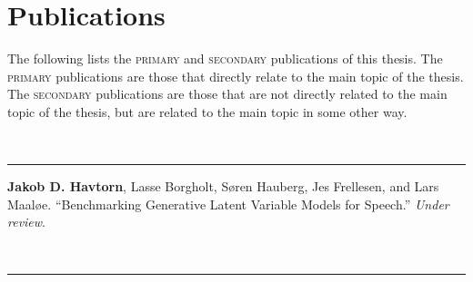 \chapter{Publications}

The following lists the \textsc{primary} and \textsc{secondary} publications of this thesis. 
The \textsc{primary} publications are those that directly relate to the main topic of the thesis.
The \textsc{secondary} publications are those that are not directly related to the main topic of the thesis, but are related to the main topic in some other way.

\vspace{5mm}

\raggedright\par\noindent\hspace{8mm}{\large\scshape Primary}\\[-2mm]

\raggedleft\rule{\textwidth - 8mm}{0.4pt}

\begin{enumerate}[leftmargin=8mm,topsep=0mm,label={[\Alph*]}]

    \item {}

    \item \textbf{Jakob D. Havtorn}, Lasse Borgholt, Søren Hauberg, Jes Frellesen, and Lars Maaløe. “Benchmarking Generative Latent Variable Models for Speech.” \textit{Under review}.

\end{enumerate}

\vspace{5mm}

\raggedright\par\noindent\hspace{8mm}{\large\scshape Secondary}\\[-2mm]

\raggedleft\rule{\textwidth - 8mm}{0.4pt}

